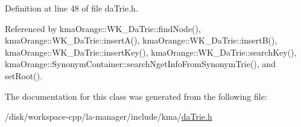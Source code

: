 Definition at line 48 of file daTrie.h.

Referenced by kmaOrange::WK\_\-DaTrie::findNode(), kmaOrange::WK\_\-DaTrie::insertA(), kmaOrange::WK\_\-DaTrie::insertB(), kmaOrange::WK\_\-DaTrie::insertKey(), kmaOrange::WK\_\-DaTrie::searchKey(), kmaOrange::SynonymContainer::searchNgetInfoFromSynonymTrie(), and setRoot().

The documentation for this class was generated from the following file:\begin{CompactItemize}
\item 
/disk/workspace-cpp/la-manager/include/kma/\hyperlink{daTrie_8h}{daTrie.h}\end{CompactItemize}
